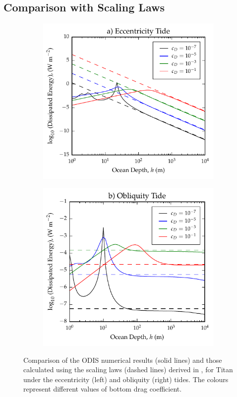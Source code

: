 \subsection{Comparison with Scaling Laws \label{subsec:scalTitan}}

\begin{figure}[!t]
\centering
\begin{subfigure}{0.5\linewidth}
\centering
\includegraphics[width=0.85\linewidth]{Figures/Eccentricity_scaling}
\subcaption{\label{fig:scalEccTitan}}
\end{subfigure}%
\begin{subfigure}{0.5\linewidth}
\centering
\includegraphics[width=0.85\linewidth]{Figures/Obliquity_scaling}
\subcaption{\label{fig:scalObliqTitan}}
\end{subfigure}
\vspace*{-0.8cm}
\caption{Comparison of the ODIS numerical results (solid lines) and those calculated using the scaling laws (dashed lines) derived in \citet{chen2013tidal}, for Titan under the eccentricity (left) and obliquity (right) tides. The colours represent different values of bottom drag coefficient.\label{fig:scalTitan}}
\end{figure}

